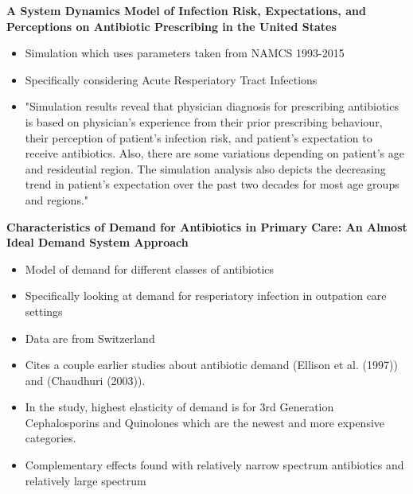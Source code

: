 



\let\counterwithout\relax
\let\counterwithin\relax
{}



\noindent\textbf{A System Dynamics Model of Infection Risk, Expectations, and Perceptions on Antibiotic Prescribing in the United States} \cite{kianmehr_system_2020}\\
\begin{itemize}
    \item Simulation which uses parameters taken from NAMCS 1993-2015
    \item Specifically considering Acute Resperiatory Tract Infections
    \item "Simulation results reveal that physician diagnosis for prescribing antibiotics is based on physician's experience from their prior prescribing behaviour, their perception of patient's infection risk, and patient's expectation to receive antibiotics. Also, there are some variations depending on patient's age and residential region. The simulation analysis also depicts the decreasing trend in patient's expectation over the past two decades for most age groups and regions."
\end{itemize}

\noindent\textbf{Characteristics of Demand for Antibiotics in Primary Care: An Almost Ideal Demand System Approach} \cite{filippini_characteristics_nodate}\\
\begin{itemize}
    \item Model of demand for different classes of antibiotics
    \item Specifically looking at demand for resperiatory infection in outpation care settings
    \item Data are from Switzerland
    \item Cites a couple earlier studies about antibiotic demand (Ellison et al. (1997)) and (Chaudhuri (2003)).
    \item In the study, highest elasticity of demand is for 3rd Generation Cephalosporins and Quinolones which are the newest and more expensive categories.
    \item Complementary effects found with relatively narrow spectrum antibiotics and relatively large spectrum
\end{itemize}

